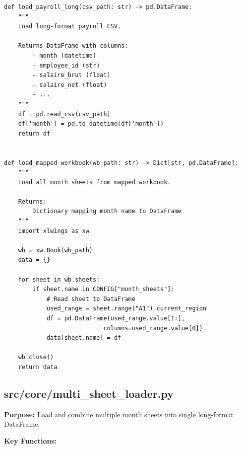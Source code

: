 \begin{lstlisting}[style=pythonstyle]
def load_payroll_long(csv_path: str) -> pd.DataFrame:
    """
    Load long-format payroll CSV.
    
    Returns DataFrame with columns:
        - month (datetime)
        - employee_id (str)
        - salaire_brut (float)
        - salaire_net (float)
        - ...
    """
    df = pd.read_csv(csv_path)
    df['month'] = pd.to_datetime(df['month'])
    return df


def load_mapped_workbook(wb_path: str) -> Dict[str, pd.DataFrame]:
    """
    Load all month sheets from mapped workbook.
    
    Returns:
        Dictionary mapping month name to DataFrame
    """
    import xlwings as xw
    
    wb = xw.Book(wb_path)
    data = {}
    
    for sheet in wb.sheets:
        if sheet.name in CONFIG["month_sheets"]:
            # Read sheet to DataFrame
            used_range = sheet.range("A1").current_region
            df = pd.DataFrame(used_range.value[1:], 
                            columns=used_range.value[0])
            data[sheet.name] = df
    
    wb.close()
    return data
\end{lstlisting}

\subsection{src/core/multi\_sheet\_loader.py}

\textbf{Purpose:} Load and combine multiple month sheets into single long-format DataFrame.

\textbf{Key Functions:}

